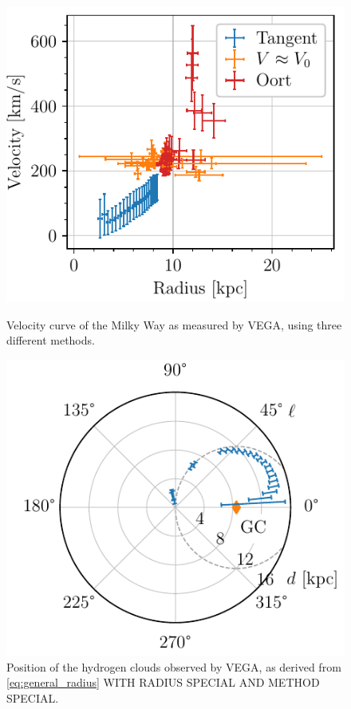 \begin{figure}[htbp]
    \begin{minipage}[t]{0.5\textwidth}
        \centering
        \captionsetup{width=.95\textwidth}
        \includegraphics[scale=1]{figures/VEGA2_velocity_curve.pdf}
        \caption{Velocity curve of the Milky Way as measured by VEGA, using three different methods.}
        \label{fig:VEGA_velocity_curve}
    \end{minipage}
    \begin{minipage}[t]{0.5\textwidth}
        \centering
        \captionsetup{width=.95\textwidth}
        \includegraphics[scale=1]{figures/VEGA_galaxy_map.pdf}
        \caption{Position of the hydrogen clouds observed by VEGA, as derived from \autoref{eq:general_radius} WITH RADIUS SPECIAL AND METHOD SPECIAL.}
        \label{fig:VEGA_galaxy_map}
    \end{minipage}
\end{figure}

